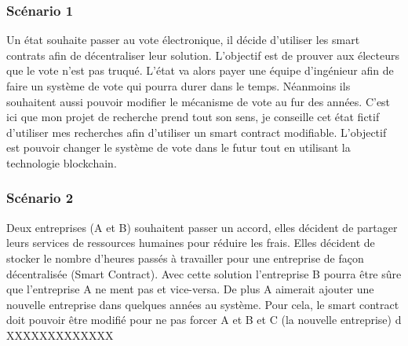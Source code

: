 \subsubsection{Scénario 1}

Un état souhaite passer au vote électronique, il décide d’utiliser les smart contrats afin de
décentraliser leur solution. L’objectif est de prouver aux électeurs que le vote n’est pas truqué. L’état va
alors payer une équipe d’ingénieur afin de faire un système de vote qui pourra durer dans le temps.
Néanmoins ils souhaitent aussi pouvoir modifier le mécanisme de vote au fur des années. C’est ici que
mon projet de recherche prend tout son sens, je conseille cet état fictif d’utiliser mes recherches afin
d’utiliser un smart contract modifiable. L’objectif est pouvoir changer le système de vote dans le futur
tout en utilisant la technologie blockchain.

\subsubsection{Scénario 2}

Deux entreprises (A et B) souhaitent passer un accord, elles décident de partager leurs services
de ressources humaines pour réduire les frais. Elles décident de stocker le nombre d’heures passés à
travailler pour une entreprise de façon décentralisée (Smart Contract). Avec cette solution l’entreprise B
pourra être sûre que l’entreprise A ne ment pas et vice-versa. De plus A aimerait ajouter une nouvelle
entreprise dans quelques années au système. Pour cela, le smart contract doit pouvoir être modifié pour
ne pas forcer A et B et C (la nouvelle entreprise) d {XXXXXXXXXXXXX}

